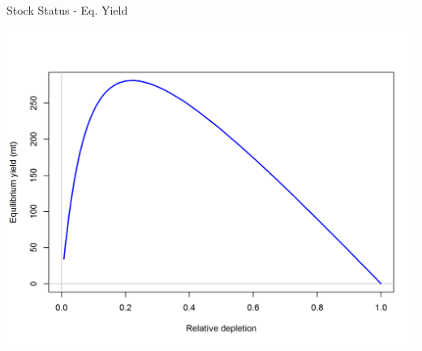 \documentclass[ignorenonframetext,]{beamer}
\begin{document}
\begin{frame}{Stock Status - Eq. Yield}

\centering
\includegraphics{r4ss/plots_mod1/yield1_yield_curve.png}

\end{frame}
\end{document}
